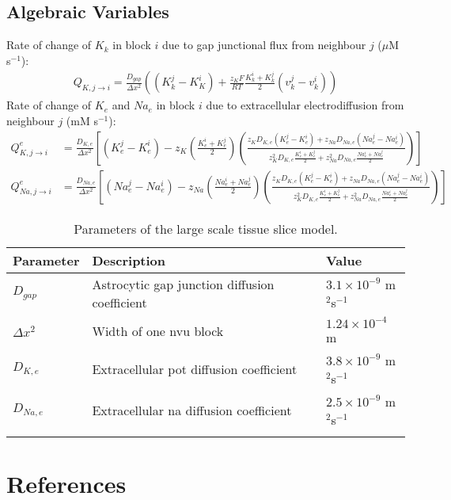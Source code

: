 \documentclass[11pt]{elsarticle}
\newcommand{\mus}{$\mu$M s$^{-1}$\xspace}
\newcommand{\e}[1]{\times 10^{#1}}
\newcommand{\psec}{s$^{-1}$\xspace}
\newcommand\ddfrac[2]{\frac{\displaystyle #1}{\displaystyle #2}}
\newcommand{\na}{\gls{na}\xspace}
\newcommand{\pot}{\gls{pot}\xspace}
\begin{document}
		\subsection{Algebraic Variables}
Rate of change of $K_k$ in block $i$ due to gap junctional flux from neighbour $j$ (\mus):
\begin{align}
Q_{K,j \to i} = \frac{D_{gap}}{\Delta x^2} \left( (K_k^j - K_K^i) + \frac{z_K F}{RT} \frac{K_k^i + K_k^j}{2} (v_k^j - v_k^i) \right)
\end{align}
%
Rate of change of $K_e$ and $Na_e$ in block $i$ due to extracellular electrodiffusion from neighbour $j$ (mM \psec):
\begin{align}
Q^{e}_{K,j\to i} &= \frac{D_{K,e}}{\Delta x^2} \left[ 
(K_e^j - K_e^i) - z_K \left(\frac{K_e^i + K_e^j}{2}\right) 
\left(   \ddfrac{z_K D_{K,e} (K_e^j - K_e^i) + z_{Na} D_{Na,e} (Na_e^j - Na_e^i)}
{z_K^2 D_{K,e} \frac{K_e^i + K_e^j}{2} + z_{Na}^2 D_{Na,e} \frac{Na_e^i + Na_e^j}{2} }
\right) 
\right]   
\\
Q^{e}_{Na,j\to i} &= \frac{D_{Na,e}}{\Delta x^2} \left[ 
(Na_e^j - Na_e^i) - z_{Na} \left(\frac{Na_e^i + Na_e^j}{2}\right) 
\left(   \ddfrac{z_K D_{K,e} (K_e^j - K_e^i) + z_{Na} D_{Na,e} (Na_e^j - Na_e^i)}
{z_K^2 D_{K,e} \frac{K_e^i + K_e^j}{2} + z_{Na}^2 D_{Na,e} \frac{Na_e^i + Na_e^j}{2} }
\right) 
\right]   
\end{align}
\pagebreak
\begin{longtable}[h!]{ p{0.12\linewidth}   p{0.66\linewidth}   p{0.22\linewidth} }
	\hline
	Parameter & Description & Value \\
	\hline
$D_{gap}$ 		& Astrocytic gap junction diffusion coefficient & $3.1\e{-9}$ m$^2$\psec \\
$\Delta x^2$ 	& Width of one \gls{nvu} block & $1.24\e{-4}$ m \\
$D_{K,e}$ 		& Extracellular \pot diffusion coefficient & $3.8\e{-9}$ m$^2$\psec \\
$D_{Na,e}$ 		& Extracellular \na diffusion coefficient & $2.5\e{-9}$ m$^2$\psec \\
\hline
\caption{Parameters of the large scale tissue slice model.}
\end{longtable}

\section*{References}


\end{document}
